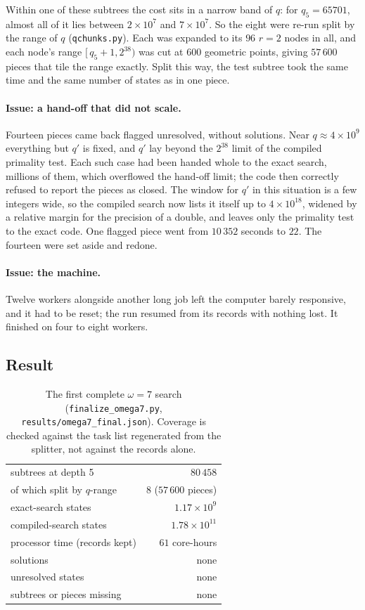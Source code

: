 \documentclass[11pt]{amsart}
\theoremstyle{remark}
\begin{document}
Within one of these subtrees the cost sits in a narrow band of $q$: for
$q_5 = 65701$, almost all of it lies between $2 \times 10^{7}$ and
$7 \times 10^{7}$. So the eight were re-run split by the range of $q$
(\texttt{qchunks.py}). Each was expanded to its $96$ $r = 2$ nodes in all, and
each node's range $[\,q_5 + 1, 2^{38})$ was cut at $600$ geometric points,
giving $57\,600$ pieces that tile the range exactly. Split this way, the test
subtree took the same time and the same number of states as in one piece.

\paragraph{Issue: a hand-off that did not scale.} Fourteen pieces came back
flagged unresolved, without solutions. Near $q \approx 4 \times 10^{9}$
everything but $q'$ is fixed, and $q'$ lay beyond the $2^{38}$ limit of the
compiled primality test. Each such case had been handed whole to the exact
search, millions of them, which overflowed the hand-off limit; the code then
correctly refused to report the pieces as closed. The window for $q'$ in this
situation is a few integers wide, so the compiled search now lists it itself up
to $4 \times 10^{18}$, widened by a relative margin for the precision of a
double, and leaves only the primality test to the exact code. One flagged piece
went from $10\,352$ seconds to $22$. The fourteen were set aside and redone.

\paragraph{Issue: the machine.} Twelve workers alongside another long job left
the computer barely responsive, and it had to be reset; the run resumed from its
records with nothing lost. It finished on four to eight workers.

\subsection{Result}
\begin{table}[h]
\centering
\begin{tabular}{lr}
\toprule
subtrees at depth 5 & $80\,458$ \\
of which split by $q$-range & $8$ ($57\,600$ pieces) \\
exact-search states & $1.17 \times 10^{9}$ \\
compiled-search states & $1.78 \times 10^{11}$ \\
processor time (records kept) & $61$ core-hours \\
solutions & none \\
unresolved states & none \\
subtrees or pieces missing & none \\
\bottomrule
\end{tabular}
\caption{The first complete $\omega = 7$ search (\texttt{finalize\_omega7.py},
\texttt{results/omega7\_final.json}). Coverage is checked against the task list
regenerated from the splitter, not against the records alone.}
\end{table}
\end{document}
